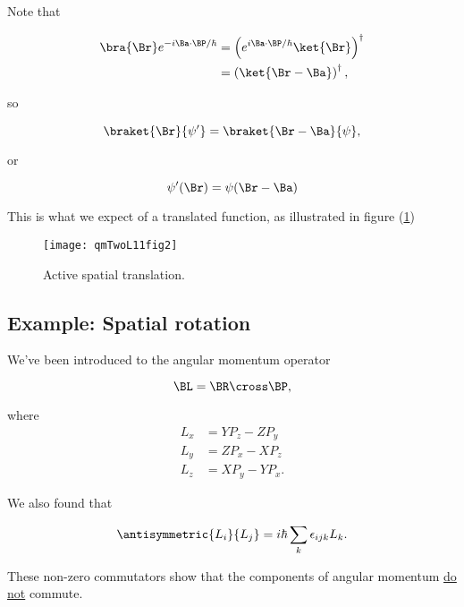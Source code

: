 Note that 

\begin{align*}
\bra{\Br} e^{-i \Ba \cdot \BP/\hbar} 
&= 
\left( e^{i \Ba \cdot \BP/\hbar} 
\ket{\Br} \right)^\dagger \\
&= 
\left( \ket{\Br - \Ba} \right)^\dagger,
\end{align*}

so

\begin{equation}\label{eqn:qmTwoL11:250}
\braket{\Br}{\psi'} 
= \braket{\Br -\Ba}{\psi},
\end{equation}

or

\begin{equation}\label{eqn:qmTwoL11:270}
\psi'(\Br) = \psi(\Br - \Ba)
\end{equation}

This is what we expect of a translated function, as illustrated in figure (\ref{fig:qmTwoL11:qmTwoL11fig2})
\begin{figure}[htp]
   \centering
   \texttt{[image: qmTwoL11fig2]}
   \caption{Active spatial translation.}\label{fig:qmTwoL11:qmTwoL11fig2}
\end{figure}

\subsection{Example: Spatial rotation}

We've been introduced to the angular momentum operator

\begin{equation}\label{eqn:qmTwoL11:290}
\BL = \BR \cross \BP,
\end{equation}

where
\begin{align}\label{eqn:qmTwoL11:310}
L_x &= Y P_z - Z P_y \\
L_y &= Z P_x - X P_z \\
L_z &= X P_y - Y P_x.
\end{align}

We also found that

\begin{equation}\label{eqn:qmTwoL11:330}
\antisymmetric{L_i}{L_j} = i \hbar \sum_k \epsilon_{ijk} L_k.
\end{equation}

These non-zero commutators show that the components of angular momentum \underline{do not} commute.

